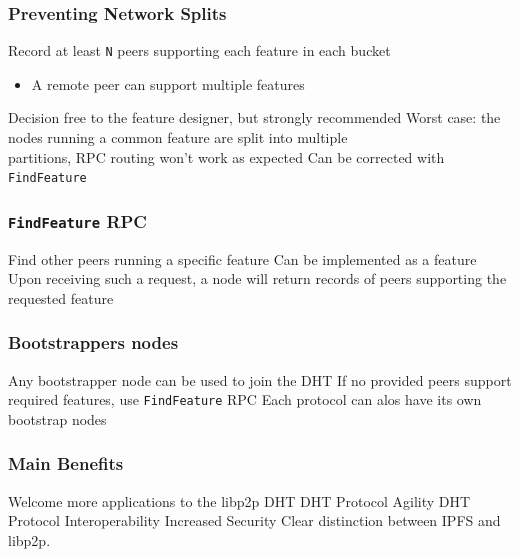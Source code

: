 \documentclass{../pl-slide}
\begin{document}
\begin{frame}
\frametitle{Preventing Network Splits}
\begin{itemize}
	\itemc Record at least \texttt{N} peers supporting each feature in each bucket
	\begin{itemize}
		\item[\greencube] A remote peer can support multiple features
	\end{itemize}
	\itemc Decision free to the feature designer, but strongly recommended
	\itemc Worst case: the nodes running a common feature are split into multiple\\partitions, RPC routing won't work as expected
	\itemc Can be corrected with \texttt{FindFeature}
\end{itemize}
\end{frame}

\begin{frame}
\frametitle{\texttt{FindFeature} RPC}

\begin{itemize}
	\itemc Find other peers running a specific feature
	\itemc Can be implemented as a feature
	\itemc Upon receiving such a request, a node will return records of peers supporting the requested feature
\end{itemize}
\end{frame}

\begin{frame}
\frametitle{Bootstrappers nodes}

\begin{itemize}
	\itemc Any bootstrapper node can be used to join the DHT
	\itemc If no provided peers support required features, use \texttt{FindFeature} RPC
	\itemc Each protocol can alos have its own bootstrap nodes
\end{itemize}
\end{frame}


\begin{frame}
\frametitle{Main Benefits}

\begin{itemize}
	\itemc Welcome more applications to the libp2p DHT
	\itemc DHT Protocol Agility
	\itemc DHT Protocol Interoperability
	\itemc Increased Security
	\itemc Clear distinction between IPFS and libp2p.
\end{itemize}
\end{frame}
\end{document}
